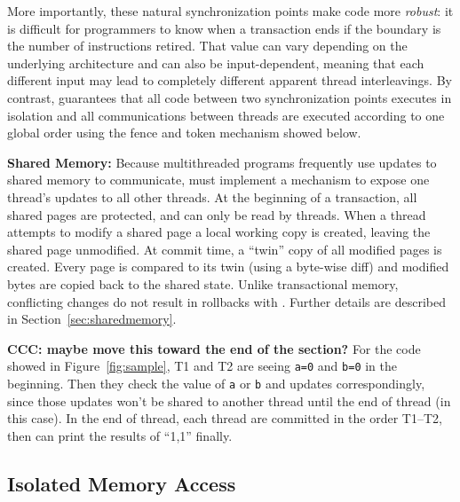 More importantly, these natural synchronization points
make \dthreads{} code more \emph{robust}: it is difficult for
programmers to know when a transaction ends if the boundary is the
number of instructions retired. That value can vary depending on the
underlying architecture and can also be input-dependent, meaning that
each different input may lead to completely different apparent thread
interleavings. By contrast, \dthreads{} guarantees that all code
between two synchronization points executes in isolation and all communications between
threads are executed according to one global order using the fence and token mechanism 
showed below.

\textbf{Shared Memory:} 
Because multithreaded programs frequently use updates to shared memory to communicate, \dthreads{} must implement a mechanism to expose one thread's updates to all other threads.  At the beginning of a transaction, all shared pages are protected, and can only be read by threads.  When a thread attempts to modify a shared page a local working copy is created, leaving the shared page unmodified.  At commit time, a ``twin'' copy of all modified pages is created.  Every page is compared to its twin (using a byte-wise diff) and modified bytes are copied back to the shared state.  Unlike transactional memory, conflicting changes do not result in rollbacks with \dthreads{}.  Further details are described in Section~\ref{sec:sharedmemory}.

\textbf{CCC: maybe move this toward the end of the section?}
For the code showed in Figure~\ref{fig:sample}, T1 and T2 are seeing \texttt{a=0} and \texttt{b=0} in the beginning. 
Then they check the value of \texttt{a} or \texttt{b} and updates correspondingly, since those updates won't be shared to 
another thread until the end of thread (in this case).
In the end of thread, each thread are committed in the order T1--T2, then \dthreads{} can print the results of ``1,1'' finally.

\subsection{Isolated Memory Access}

